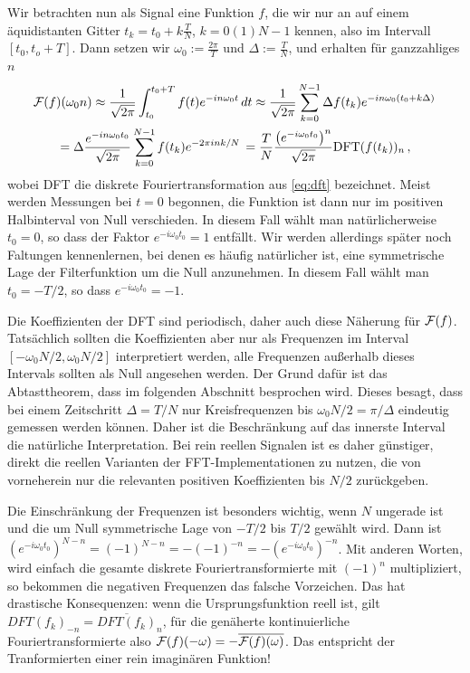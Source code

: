 Wir betrachten nun als Signal eine Funktion $f$, die wir nur an auf
einem äquidistanten Gitter $t_k = t_0 + k\frac{T}{N}$, $k=0(1)N-1$
kennen, also im Intervall $[t_0, t_o + T]$. Dann setzen wir
$\omega_0:=\frac{2\pi}{T}$ und $\Delta := \frac{T}{N}$, und erhalten
für ganzzahliges $n$
\begin{multline}
  \label{eq:dftcont}
  \mathcal F(f)(\omega_0 n)\approx
  \frac{1}{\sqrt{2\pi}}\int_{t_0}^{t_0 + T} f(t)e^{-i n \omega_0 t}\, dt
  \approx
  \frac{1}{\sqrt{2\pi}}\sum_{k=0}^{N-1}
  \Delta f(t_k)
  e^{-i n\omega_0 \left(t_0 + k\Delta\right)}\,
  \\
  =   \Delta \frac{e^{-i n\omega_0 t_0}}{\sqrt{2\pi}}\sum_{k=0}^{N-1}
  f(t_k) e^{-2\pi i n k / N}\,
  =\frac{T}{N}\frac{\left(e^{-i\omega_0 t_0}\right)^n}{\sqrt{2\pi}} \text{DFT}(f(t_k))_n\,,
\end{multline}
wobei DFT die diskrete Fouriertransformation aus \eqref{eq:dft}
bezeichnet. Meist werden Messungen bei $t=0$ begonnen, die Funktion
ist dann nur im positiven Halbinterval von Null verschieden.  In
diesem Fall wählt man natürlicherweise $t_0 = 0$, so dass der Faktor
$e^{-i\omega_0 t_0} = 1$ entfällt. Wir werden allerdings später noch
Faltungen kennenlernen, bei denen es häufig natürlicher ist, eine
symmetrische Lage der Filterfunktion um die Null anzunehmen. In diesem
Fall wählt man $t_0 = -T/2$, so dass $e^{-i\omega_0 t_0} = -1$.

Die Koeffizienten der DFT sind periodisch, daher auch diese Näherung
für $\mathcal F(f)$. Tatsächlich sollten die Koeffizienten aber nur als
Frequenzen im Interval $[-\omega_0 N/2,\omega_0 N/2]$ interpretiert
werden, alle Frequenzen außerhalb dieses Intervals sollten als Null
angesehen werden. Der Grund dafür ist das Abtasttheorem, dass im
folgenden Abschnitt besprochen wird. Dieses besagt, dass bei einem
Zeitschritt $\Delta=T/N$ nur Kreisfrequenzen bis $\omega_0 N/2 =
\pi/\Delta$ eindeutig gemessen werden können. Daher ist die
Beschränkung auf das innerste Interval die natürliche
Interpretation. Bei rein reellen Signalen ist es daher günstiger,
direkt die reellen Varianten der FFT-Implementationen zu nutzen, die
von vorneherein nur die relevanten positiven Koeffizienten bis $N/2$
zurückgeben.

Die Einschränkung der Frequenzen ist besonders wichtig, wenn $N$
ungerade ist und die um Null symmetrische Lage von $-T/2$ bis $T/2$
gewählt wird. Dann ist $\left(e^{-i\omega_0 t_0}\right)^{N-n} =
(-1)^{N-n} = - (-1)^{-n} = -\left(e^{-i\omega_0 t_0}\right)^{-n}$. Mit
anderen Worten, wird einfach die gesamte diskrete
Fouriertransformierte mit $(-1)^n$ multipliziert, so bekommen die
negativen Frequenzen das falsche Vorzeichen. Das hat drastische
Konsequenzen: wenn die Ursprungsfunktion reell ist, gilt
$DFT(f_k)_{-n}=\overline{DFT(f_k)}_{n}$, für die genäherte
kontinuierliche Fouriertransformierte also
$\mathcal F(f)(-\omega)=-\overline{\mathcal F(f)(\omega)}$. Das entspricht der
Tranformierten einer rein imaginären Funktion!


